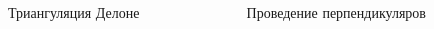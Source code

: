 \documentclass[pdf,hyperref={unicode}]{beamer}
\begin{document}
\begin{frame}
\begin{columns}
\begin{column}{0.3\linewidth}
\begin{figure}[h]
\caption{\tiny Триангуляция Делоне}
\end{figure}
\end{column}



\begin{column}{0.3\linewidth}
\begin{figure}[h]
\caption{\tiny Проведение перпендикуляров}
\end{figure}
\end{column}



\end{columns}
\end{frame}
\end{document}
